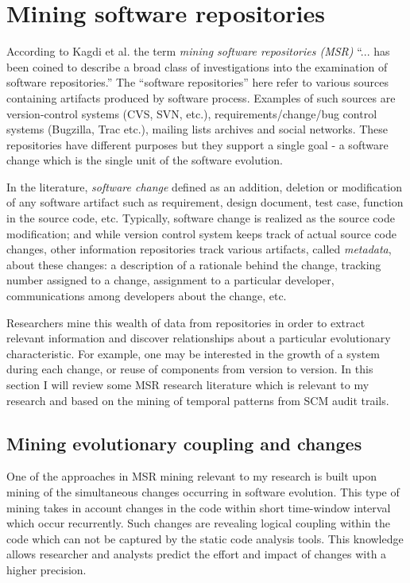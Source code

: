 \section{Mining software repositories}\label{evolution.discovery}
According to Kagdi et al. \cite{citeulike:4534888} the term \textit{mining software repositories (MSR)} ``... has been coined to describe a broad class of investigations into the examination of software repositories.'' The ``software repositories'' here refer to various sources containing artifacts produced by software process. Examples of such sources are version-control systems (CVS, SVN, etc.), requirements/change/bug control systems (Bugzilla, Trac etc.), mailing lists archives and social networks. These repositories have different purposes but they support a single goal - a software change which is the single unit of the software evolution. 

In the literature, \textit{software change} defined as an addition, deletion or modification of any software artifact such as requirement, design document, test case, function in the source code, etc. Typically, software change is realized as the source code modification; and while version control system keeps track of actual source code changes, other information repositories track various artifacts, called \textit{metadata}, about these changes: a description of a rationale behind the change, tracking number assigned to a change, assignment to a particular developer, communications among developers about the change, etc.

Researchers mine this wealth of data from repositories in order to extract relevant information and discover relationships about a particular evolutionary characteristic. For example, one may be interested in the growth of a system during each change, or reuse of components from version to version. In this section I will review some MSR research literature which is relevant to my research and based on the mining of temporal patterns from SCM audit trails.

\subsection{Mining evolutionary coupling and changes}
One of the approaches in MSR mining relevant to my research is built upon mining of the simultaneous changes occurring in software evolution. This type of mining takes in account changes in the code within short time-window interval which occur recurrently. Such changes are revealing logical coupling within the code which can not be captured by the static code analysis tools. This knowledge allows researcher and analysts predict the effort and impact of changes with a higher precision. 

